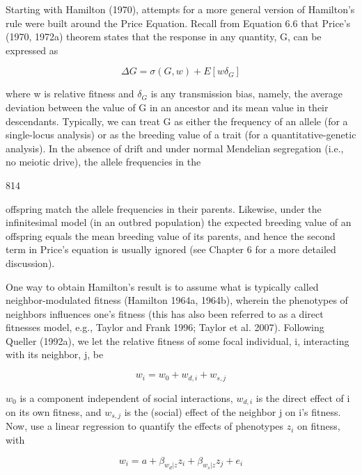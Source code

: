 \documentclass{article}
\begin{document}
Starting with Hamilton (1970), attempts for a more general version of Hamilton’s rule were built around the Price Equation. Recall from Equation 6.6 that Price’s (1970, 1972a) theorem states that the response in any quantity, G, can be expressed as

\begin{equation}
\Delta G=\sigma(G,w)+E[w\delta_{G}]
\tag{22.54}
\label{eq:22_54}
\end{equation}

where w is relative fitness and  $ \delta_{G} $ is any transmission bias, namely, the average deviation between the value of G in an ancestor and its mean value in their descendants. Typically, we can treat G as either the frequency of an allele (for a single-locus analysis) or as the breeding value of a trait (for a quantitative-genetic analysis). In the absence of drift and under normal Mendelian segregation (i.e., no meiotic drive), the allele frequencies in the

814

offspring match the allele frequencies in their parents. Likewise, under the infinitesimal model (in an outbred population) the expected breeding value of an offspring equals the mean breeding value of its parents, and hence the second term in Price's equation is usually ignored (see Chapter 6 for a more detailed discussion).

One way to obtain Hamilton’s result is to assume what is typically called neighbor-modulated fitness (Hamilton 1964a, 1964b), wherein the phenotypes of neighbors influences one’s fitness (this has also been referred to as a direct fitnesses model, e.g., Taylor and Frank 1996; Taylor et al. 2007). Following Queller (1992a), we let the relative fitness of some focal individual, i, interacting with its neighbor, j, be

\begin{equation}
w_{i}=w_{0}+w_{d,i}+w_{s,j}
\tag{22.55a}
\label{eq:22_55a}
\end{equation}

 $ w_{0} $ is a component independent of social interactions,  $ w_{d,i} $ is the direct effect of i on its own fitness, and  $ w_{s,j} $ is the (social) effect of the neighbor j on i's fitness. Now, use a linear regression to quantify the effects of phenotypes  $ z_{i} $ on fitness, with

\begin{equation}
w_{i}=a+\beta_{w_{d}|z}z_{i}+\beta_{w_{s}|z}z_{j}+e_{i}
\tag{22.55b}
\label{eq:22_55b}
\end{equation}
\end{document}
